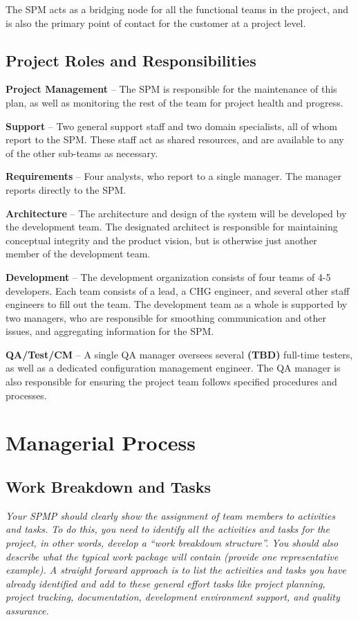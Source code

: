 \documentclass[11pt]{article}
\begin{document}
The SPM acts as a bridging node for all the functional teams in the project, and is also the primary
point of contact for the customer at a project level.  





\subsection{Project Roles and Responsibilities}
\textbf{Project Management} -- The SPM is responsible for the maintenance of this plan, as well as
monitoring the rest of the team for project health and progress.

\textbf{Support} -- Two general support staff and two domain specialists, all of whom report to the SPM.
These staff act as shared resources, and are available to any of the other sub-teams as necessary.

\textbf{Requirements} -- Four analysts, who report to a single manager.  The manager reports directly to
the SPM.

\textbf{Architecture} -- The architecture and design of the system will be developed by the development
team.  The designated architect is responsible for maintaining conceptual integrity and the product
vision, but is otherwise just another member of the development team.

\textbf{Development} -- The development organization consists of four teams of 4-5 developers.  Each
team consists of a lead, a CHG engineer, and several other staff engineers to fill out the team.
The development team as a whole is supported by two managers, who are responsible for smoothing
communication and other issues, and aggregating information for the SPM.

\textbf{QA/Test/CM} -- A single QA manager oversees several \textbf{(TBD)} full-time testers, as
well as a dedicated configuration management engineer.  The QA manager is also responsible for
ensuring the project team follows specified procedures and processes.



\section{Managerial Process}
\subsection{Work Breakdown and Tasks}
{\it Your SPMP should clearly show the assignment of team members to activities and tasks.  To do this,
you need to identify all the activities and tasks for the project, in other words, develop a “work
breakdown structure”.  You should also describe what the typical work package will contain (provide
one representative example).  A straight forward approach is to list the activities and tasks you
have already identified and add to these general effort tasks like project planning, project
tracking, documentation, development environment support, and quality assurance.}
\end{document}
